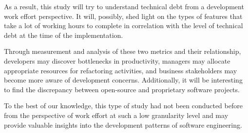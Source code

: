 As a result, this study will try to understand technical debt from a development
work effort perspective. It will, possibly, shed light on the types of features
that take a lot of working hours to complete in correlation with the level of
technical debt at the time of the implementation.

Through measurement and analysis of these two metrics and their relationship,
developers may discover bottlenecks in productivity, managers may allocate
appropriate resources for refactoring activities, and business stakeholders may
become more aware of development concerns. Additionally, it will be interesting
to find the discrepancy between open-source and proprietary software projects.

To the best of our knowledge, this type of study had not been conducted before
from the perspective of work effort at such a low granularity level and may
provide valuable insights into the development patterns of software engineering.




